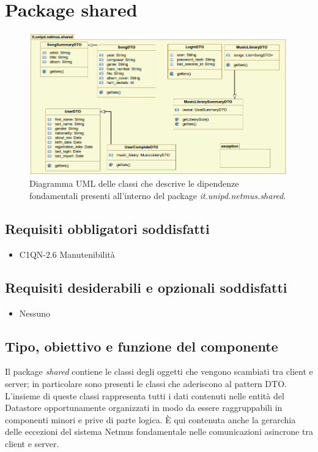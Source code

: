 \newpage
\section{Package shared}

\begin{figure}[!h]
  \centering
  \includegraphics[width=15cm]{img/DP/classes_shared.png}
\caption{Diagramma UML delle classi che descrive le dipendenze
fondamentali presenti all'interno del package
\emph{it.unipd.netmus.shared}.}
\end{figure}

\subsection*{Requisiti obbligatori soddisfatti}
\begin{itemize}
  	\item C1QN-2.6 Manutenibilit\`a
\end{itemize}
\subsection*{Requisiti desiderabili e opzionali soddisfatti}
\begin{itemize}
    \item Nessuno
\end{itemize}
\subsection*{Tipo, obiettivo e funzione del componente}
Il package \emph{shared} contiene le classi degli oggetti che vengono
scambiati tra client e server; in particolare sono presenti le classi che
aderiscono al pattern DTO. L'insieme di queste classi rappresenta tutti i
dati contenuti nelle entit\`a del Datastore opportunamente organizzati in modo
da essere raggruppabili in componenti minori e prive di parte logica.
\`E qui contenuta anche la gerarchia delle eccezioni del sistema Netmus
fondamentale nelle comunicazioni asincrone tra client e server.

